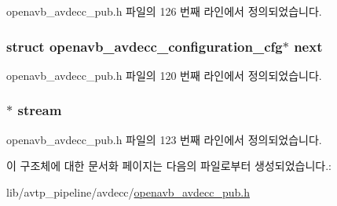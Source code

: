 openavb\+\_\+avdecc\+\_\+pub.\+h 파일의 126 번째 라인에서 정의되었습니다.

\subsubsection[{\texorpdfstring{next}{next}}]{\setlength{\rightskip}{0pt plus 5cm}struct {\bf openavb\+\_\+avdecc\+\_\+configuration\+\_\+cfg}$\ast$ next}\hypertarget{structopenavb__avdecc__configuration__cfg_a13b43aae3e8c6dd90ec7d829cb84d0d5}{}\label{structopenavb__avdecc__configuration__cfg_a13b43aae3e8c6dd90ec7d829cb84d0d5}


openavb\+\_\+avdecc\+\_\+pub.\+h 파일의 120 번째 라인에서 정의되었습니다.

\subsubsection[{\texorpdfstring{stream}{stream}}]{$\ast$ stream}\hypertarget{structopenavb__avdecc__configuration__cfg_a92c9ac28f244e59bcba3681be48f1c86}{}\label{structopenavb__avdecc__configuration__cfg_a92c9ac28f244e59bcba3681be48f1c86}


openavb\+\_\+avdecc\+\_\+pub.\+h 파일의 123 번째 라인에서 정의되었습니다.



이 구조체에 대한 문서화 페이지는 다음의 파일로부터 생성되었습니다.\+:\begin{DoxyCompactItemize}
\item 
lib/avtp\+\_\+pipeline/avdecc/\hyperlink{openavb__avdecc__pub_8h}{openavb\+\_\+avdecc\+\_\+pub.\+h}\end{DoxyCompactItemize}
